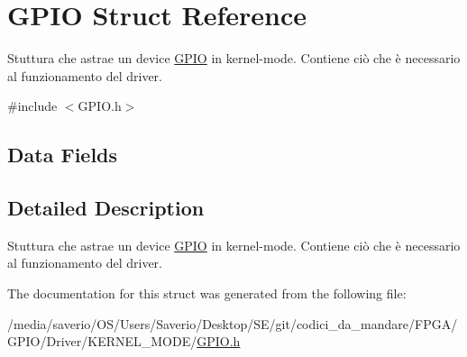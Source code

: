 \hypertarget{structGPIO}{}\section{G\+P\+IO Struct Reference}
\label{structGPIO}


Stuttura che astrae un device \hyperlink{structGPIO}{G\+P\+IO} in kernel-\/mode. Contiene ciò che è necessario al funzionamento del driver.  




{\ttfamily \#include $<$G\+P\+I\+O.\+h$>$}

\subsection*{Data Fields}


\subsection{Detailed Description}
Stuttura che astrae un device \hyperlink{structGPIO}{G\+P\+IO} in kernel-\/mode. Contiene ciò che è necessario al funzionamento del driver. 

The documentation for this struct was generated from the following file\+:\begin{DoxyCompactItemize}
\item 
/media/saverio/\+O\+S/\+Users/\+Saverio/\+Desktop/\+S\+E/git/codici\+\_\+da\+\_\+mandare/\+F\+P\+G\+A/\+G\+P\+I\+O/\+Driver/\+K\+E\+R\+N\+E\+L\+\_\+\+M\+O\+D\+E/\hyperlink{GPIO_8h}{G\+P\+I\+O.\+h}\end{DoxyCompactItemize}
